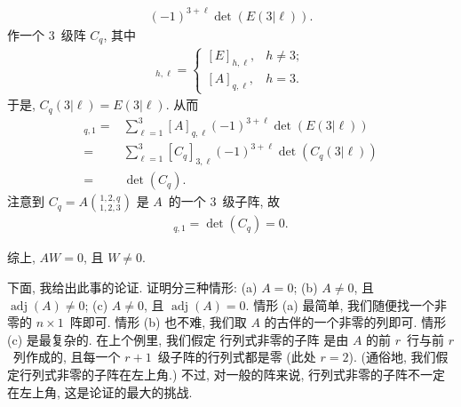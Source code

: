 \begin{example}
\begin{align*}
{        (-1)^{3+\ell} \det {(E(3|\ell))}}.
    \end{align*}
    作一个 \(3\)~级阵 \(C_q\), 其中
    \begin{align*}
        [C_q]_{h,\ell}
        = \begin{cases}
              [E]_{h,\ell},
               & h \neq 3; \\
              [A]_{q,\ell},
               & h = 3.
          \end{cases}
    \end{align*}
    于是, \(C_q(3|\ell) = E(3|\ell)\).
    从而
    \begin{align*}
        [AW]_{q,1}
        = {} &
        \sum_{\ell=1}^{3}
        {[A]_{q,\ell}
        (-1)^{3+\ell} \det {(E(3|\ell))}}
        \\
        = {} &
        \sum_{\ell=1}^{3}
        {[C_q]_{3,\ell}
        (-1)^{3+\ell} \det {(C_q (3|\ell))}}
        \\
        = {} &
        \det {(C_q)}.
    \end{align*}
    注意到
    \(
    \displaystyle
    C_q = A\binom{1,2,q}{1,2,3}
    \)
    是 \(A\)~的一个 \(3\)~级子阵,
    故
    \begin{align*}
        [AW]_{q,1} = \det {(C_q)} = 0.
    \end{align*}

    综上, \(AW = 0\), 且 \(W \neq 0\).
\end{example}

下面, 我给出此事的论证.
证明分三种情形:
(a)
\(A = 0\);
(b)
\(A \neq 0\), 且
\(\operatorname{adj} {(A)} \neq 0\);
(c)
\(A \neq 0\), 且
\(\operatorname{adj} {(A)} = 0\).
情形 (a) 最简单,
我们随便找一个非零的 \(n \times 1\)~阵即可.
情形 (b) 也不难,
我们取 \(A\) 的古伴的一个非零的列即可.
情形 (c) 是最复杂的.
在上个例里, 我们假定%
行列式非零的子阵%
是由 \(A\) 的前 \(r\)~行与前 \(r\)~列作成的,
且每一个 \(r+1\)~级子阵的行列式都是零
(此处 \(r = 2\)).
(通俗地, 我们假定行列式非零的子阵在左上角.)
不过, 对一般的阵来说,
行列式非零的子阵不一定在左上角,
这是论证的最大的挑战.

